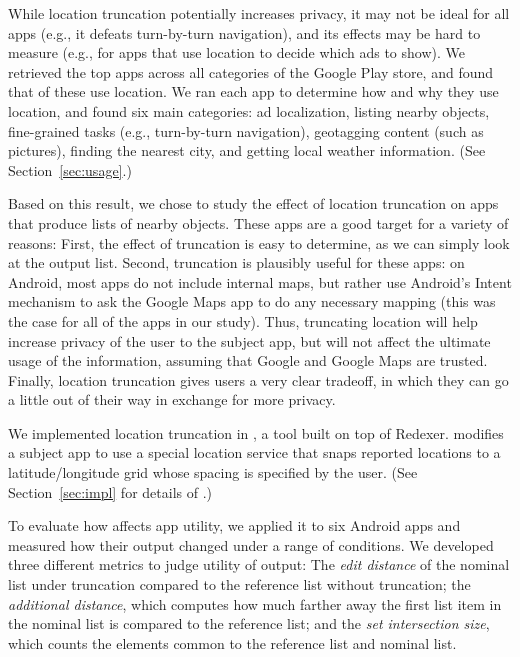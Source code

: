 While location truncation potentially increases privacy, it may not be
ideal for all apps (e.g., it defeats turn-by-turn navigation), and its
effects may be hard to measure (e.g., for apps that use location to
decide which ads to show).  We retrieved the top \numinvestigatedapps
apps across all categories of the Google Play store, and found that
\numappsusinglocation of these use location. We ran each app to
determine how and why they use location, and found six main
categories: ad localization, listing nearby objects, fine-grained
tasks (e.g., turn-by-turn navigation), geotagging content (such as
pictures), finding the nearest city, and getting local weather
information. (See Section~\ref{sec:usage}.)

Based on this result, we chose to study the effect of location
truncation on apps that produce lists of nearby objects.  These apps
are a good target for a variety of reasons: First, the effect of
truncation is easy to determine, as we can simply look at the output
list. Second, truncation is plausibly useful for these apps: on
Android, most apps do not include internal maps, but rather use
Android's Intent mechanism to ask the Google Maps app to do any
necessary mapping (this was the case for all of the apps in our
study).  Thus, truncating location will help increase privacy of the
user to the subject app, but will not affect the ultimate usage of the
information, assuming that Google and Google Maps are trusted.
Finally, location truncation gives users a very clear tradeoff, in
which they can go a little out of their way in exchange for more
privacy.

We implemented location truncation in \fuzzer{}, a tool built on top
of Redexer. \fuzzer{} modifies a subject app to use a special location
service that snaps reported locations to a latitude/longitude grid
whose spacing is specified by the user. (See Section~\ref{sec:impl}
for details of \fuzzer{}.)

To evaluate how \fuzzer{} affects app utility, we applied it to six
Android apps and measured how their output changed under a range of
conditions.
We developed three different metrics to judge utility of output: The
\emph{edit distance} of the nominal list under truncation compared to
the reference list without truncation; the \emph{additional distance},
which computes how much farther away the first list item in the
nominal list is compared to the reference list; and the \emph{set
  intersection size}, which counts the elements common to the
reference list and nominal list.

